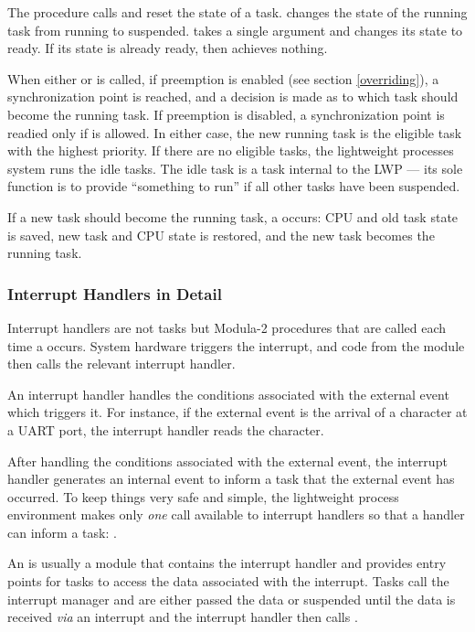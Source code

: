 The procedure calls  and  reset the
state of a task.   changes the state of the running
task from running to suspended.   takes a single
 argument and changes its state to ready.  If its state
is already ready, then  achieves nothing.

When either  or  is called, if
preemption is enabled (see section \ref{overriding}), a synchronization
point is reached, and a decision is made as to which task should become the
running task.  If preemption is disabled, a synchronization point is readied
only if  is allowed.  In either case, the new running
task is the eligible task with the highest priority.  If there are no
eligible tasks, the lightweight processes system runs the idle tasks.
The idle task is a task internal to the LWP --- its sole function is to
provide ``something to run'' if all other tasks have been suspended.

If a new task should become the running task, a  occurs:
CPU and old task state is saved, new task and CPU state is restored, and the
new task becomes the running task.

\subsubsection{Interrupt Handlers in Detail}

Interrupt handlers are not tasks but Modula-2 procedures that are called
each time a  occurs.  System hardware triggers
the interrupt, and code from the  module then calls the
relevant interrupt handler.

An interrupt handler handles the conditions associated with the external
event which triggers it.  For instance, if the external event is the arrival
of a character at a UART port, the interrupt handler reads the
character.

After handling the conditions associated with the external event, the
interrupt handler generates an internal event to inform a task that
the external event has occurred.  To keep things very safe and simple, the
lightweight process environment makes only {\em one\/} call available to
interrupt handlers so that a handler can inform a task: .

An  is usually a module that contains the
interrupt handler and provides entry points for tasks to access the data
associated with the interrupt.  Tasks call the interrupt manager and are
either passed the data or suspended until the data is received {\em via\/}
an interrupt and the interrupt handler then calls .

